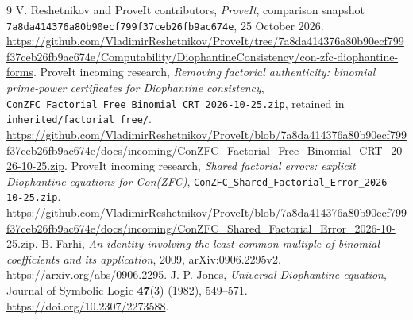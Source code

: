 \begingroup\raggedright
\begin{thebibliography}{9}
 V. Reshetnikov and ProveIt contributors,
\emph{ProveIt}, comparison snapshot
\texttt{7a8da414376a80b90ecf799f37ceb26fb9ac674e}, 25 October 2026.
\url{https://github.com/VladimirReshetnikov/ProveIt/tree/7a8da414376a80b90ecf799f37ceb26fb9ac674e/Computability/DiophantineConsistency/con-zfc-diophantine-forms}.
 ProveIt incoming research,
\emph{Removing factorial authenticity: binomial prime-power certificates
for Diophantine consistency},
\nolinkurl{ConZFC_Factorial_Free_Binomial_CRT_2026-10-25.zip},
retained in \nolinkurl{inherited/factorial_free/}.
\url{https://github.com/VladimirReshetnikov/ProveIt/blob/7a8da414376a80b90ecf799f37ceb26fb9ac674e/docs/incoming/ConZFC_Factorial_Free_Binomial_CRT_2026-10-25.zip}.
 ProveIt incoming research,
\emph{Shared factorial errors: explicit Diophantine equations for Con(ZFC)},
\nolinkurl{ConZFC_Shared_Factorial_Error_2026-10-25.zip}.
\url{https://github.com/VladimirReshetnikov/ProveIt/blob/7a8da414376a80b90ecf799f37ceb26fb9ac674e/docs/incoming/ConZFC_Shared_Factorial_Error_2026-10-25.zip}.
 B. Farhi,
\emph{An identity involving the least common multiple of binomial
coefficients and its application}, 2009, arXiv:0906.2295v2.
\url{https://arxiv.org/abs/0906.2295}.
 J. P. Jones, \emph{Universal Diophantine equation},
Journal of Symbolic Logic \textbf{47}(3) (1982), 549--571.
\url{https://doi.org/10.2307/2273588}.
\end{thebibliography}
\endgroup
